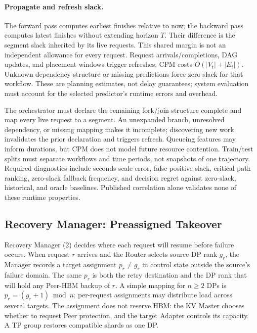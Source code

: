 \paragraph{Propagate and refresh slack.}
The forward pass computes earliest finishes relative to now; the
backward pass computes latest finishes without extending horizon $T$.
Their difference is the segment slack inherited by its live requests.
This shared margin is not an independent allowance for every request.
Request arrivals/completions, DAG updates, and placement windows trigger
refreshes; CPM costs $O(|V_t|+|E_t|)$. Unknown dependency structure or missing
predictions force zero slack for that workflow. These are planning
estimates, not delay guarantees; system evaluation must account for
the selected predictor's runtime errors and overhead.

The orchestrator must declare the remaining fork/join structure complete
and map every live request to a segment. An unexpanded branch, unresolved
dependency, or missing mapping makes it incomplete; discovering new work
invalidates the prior declaration and triggers refresh. Queueing features
may inform durations, but CPM does not model future resource contention.
Train/test splits must separate workflows and time periods, not snapshots
of one trajectory. Required diagnostics include seconds-scale error,
false-positive slack, critical-path ranking, zero-slack fallback frequency,
and decision regret against zero-slack, historical, and oracle baselines.
Published correlation alone validates none of these runtime properties.
\subsection{Recovery Manager: Preassigned Takeover}
\label{sec:parallel-recovery}
\label{sec:recovery-manager}

Recovery Manager (2) decides where each request will resume before
failure occurs. When request $r$ arrives and the Router selects source
DP rank $g_r$, the Manager records a target assignment $p_r\ne g_r$
in control state outside the source's failure domain. The same $p_r$
is both the retry destination and the DP rank that will hold any
Peer-HBM backup of $r$. A simple mapping for $n\ge2$ DPs is
$p_r=(g_r+1)\bmod n$; per-request assignments may distribute load across
several targets. The assignment does not reserve HBM: the KV Master
chooses whether to request Peer protection, and the target Adapter
controls its capacity. A TP group restores compatible shards as one DP.

